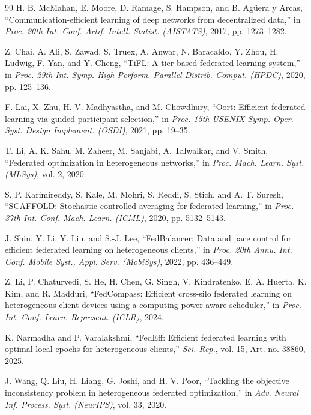 \documentclass[conference]{IEEEtran}
\begin{document}
\balance
\begin{thebibliography}{99}
H. B. McMahan, E. Moore, D. Ramage, S. Hampson, and B. Ag\"uera y Arcas, ``Communication-efficient learning of deep networks from decentralized data,'' in \textit{Proc. 20th Int. Conf. Artif. Intell. Statist. (AISTATS)}, 2017, pp. 1273--1282.

Z. Chai, A. Ali, S. Zawad, S. Truex, A. Anwar, N. Baracaldo, Y. Zhou, H. Ludwig, F. Yan, and Y. Cheng, ``TiFL: A tier-based federated learning system,'' in \textit{Proc. 29th Int. Symp. High-Perform. Parallel Distrib. Comput. (HPDC)}, 2020, pp. 125--136.

F. Lai, X. Zhu, H. V. Madhyastha, and M. Chowdhury, ``Oort: Efficient federated learning via guided participant selection,'' in \textit{Proc. 15th USENIX Symp. Oper. Syst. Design Implement. (OSDI)}, 2021, pp. 19--35.

T. Li, A. K. Sahu, M. Zaheer, M. Sanjabi, A. Talwalkar, and V. Smith, ``Federated optimization in heterogeneous networks,'' in \textit{Proc. Mach. Learn. Syst. (MLSys)}, vol. 2, 2020.

S. P. Karimireddy, S. Kale, M. Mohri, S. Reddi, S. Stich, and A. T. Suresh, ``SCAFFOLD: Stochastic controlled averaging for federated learning,'' in \textit{Proc. 37th Int. Conf. Mach. Learn. (ICML)}, 2020, pp. 5132--5143.

J. Shin, Y. Li, Y. Liu, and S.-J. Lee, ``FedBalancer: Data and pace control for efficient federated learning on heterogeneous clients,'' in \textit{Proc. 20th Annu. Int. Conf. Mobile Syst., Appl. Serv. (MobiSys)}, 2022, pp. 436--449.

Z. Li, P. Chaturvedi, S. He, H. Chen, G. Singh, V. Kindratenko, E. A. Huerta, K. Kim, and R. Madduri, ``FedCompass: Efficient cross-silo federated learning on heterogeneous client devices using a computing power-aware scheduler,'' in \textit{Proc. Int. Conf. Learn. Represent. (ICLR)}, 2024.

K. Narmadha and P. Varalakshmi, ``FedEff: Efficient federated learning with optimal local epochs for heterogeneous clients,'' \textit{Sci. Rep.}, vol. 15, Art. no. 38860, 2025.

J. Wang, Q. Liu, H. Liang, G. Joshi, and H. V. Poor, ``Tackling the objective inconsistency problem in heterogeneous federated optimization,'' in \textit{Adv. Neural Inf. Process. Syst. (NeurIPS)}, vol. 33, 2020.


\end{thebibliography}
\end{document}
